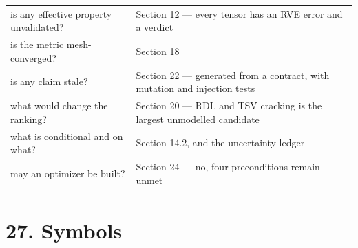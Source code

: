 \documentclass[10pt,]{article}
\begin{document}
\begin{longtable}[]{@{}ll@{}}
\begin{minipage}[t]{0.47\columnwidth}
is any effective property unvalidated?\strut
\end{minipage} & \begin{minipage}[t]{0.47\columnwidth}\raggedright
Section 12 --- every tensor has an RVE error and a verdict\strut
\end{minipage}\tabularnewline
\begin{minipage}[t]{0.47\columnwidth}\raggedright
is the metric mesh-converged?\strut
\end{minipage} & \begin{minipage}[t]{0.47\columnwidth}\raggedright
Section 18\strut
\end{minipage}\tabularnewline
\begin{minipage}[t]{0.47\columnwidth}\raggedright
is any claim stale?\strut
\end{minipage} & \begin{minipage}[t]{0.47\columnwidth}\raggedright
Section 22 --- generated from a contract, with mutation and injection
tests\strut
\end{minipage}\tabularnewline
\begin{minipage}[t]{0.47\columnwidth}\raggedright
what would change the ranking?\strut
\end{minipage} & \begin{minipage}[t]{0.47\columnwidth}\raggedright
Section 20 --- RDL and TSV cracking is the largest unmodelled
candidate\strut
\end{minipage}\tabularnewline
\begin{minipage}[t]{0.47\columnwidth}\raggedright
what is conditional and on what?\strut
\end{minipage} & \begin{minipage}[t]{0.47\columnwidth}\raggedright
Section 14.2, and the uncertainty ledger\strut
\end{minipage}\tabularnewline
\begin{minipage}[t]{0.47\columnwidth}\raggedright
may an optimizer be built?\strut
\end{minipage} & \begin{minipage}[t]{0.47\columnwidth}\raggedright
Section 24 --- no, four preconditions remain unmet\strut
\end{minipage}\tabularnewline
\bottomrule
\end{longtable}

\hypertarget{symbols}{%
\section{27. Symbols}\label{symbols}}
\end{document}
